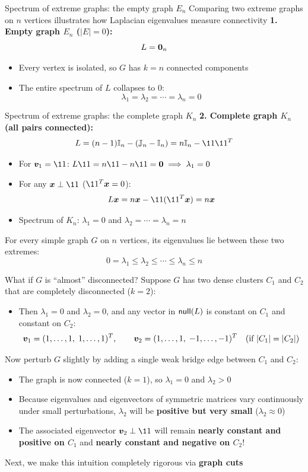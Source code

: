 \documentclass[aspectratio=169]{beamer}\usepackage[]{graphicx}\usepackage[]{xcolor}
\begin{document}


\begin{frame}{Spectrum of extreme graphs: the empty graph $E_n$}
Comparing two extreme graphs on $n$ vertices illustrates how Laplacian eigenvalues measure connectivity
\vfill
\textbf{1. Empty graph $E_n$ ($|E| = 0$):}
\[
L = \b0_n
\]
\vfill
\begin{itemize}
\item Every vertex is isolated, so $G$ has $k = n$ connected components
\vfill
\item The entire spectrum of $L$ collapses to $0$:
\[
\lambda_1 = \lambda_2 = \cdots = \lambda_n = 0
\]
\end{itemize}
\end{frame}


\begin{frame}{Spectrum of extreme graphs: the complete graph $K_n$}
\textbf{2. Complete graph $K_n$ (all pairs connected):}
\[
L = (n - 1)\II_n - (\IJ_n - \II_n) = n\II_n - \11\11^T
\]
\begin{itemize}
\item For $\bv_1 = \11$: $L\11 = n\11 - n\11 = \b0 \implies \lambda_1 = 0$
\item For any $\bx \perp \11$ ($\11^T \bx = 0$):
\[
L\bx = n\bx - \11(\11^T \bx) = n\bx
\]
\item Spectrum of $K_n$: $\lambda_1 = 0$ and $\lambda_2 = \cdots = \lambda_n = n$
\end{itemize}
\vfill
For every simple graph $G$ on $n$ vertices, its eigenvalues lie between these two extremes:
\[
0 = \lambda_1 \le \lambda_2 \le \cdots \le \lambda_n \le n
\]
\end{frame}


\begin{frame}{What if $G$ is ``almost'' disconnected?}
Suppose $G$ has two dense clusters $C_1$ and $C_2$ that are completely disconnected ($k = 2$):
\begin{itemize}
\item Then $\lambda_1 = 0$ and $\lambda_2 = 0$, and any vector in $\mathsf{null}(L)$ is constant on $C_1$ and constant on $C_2$:
\[
\bm{v}_1 = (1, \ldots, 1, \; 1, \ldots, 1)^T, \qquad \bm{v}_2 = (1, \ldots, 1, \; -1, \ldots, -1)^T \quad (\text{if } |C_1| = |C_2|)
\]
\end{itemize}
\vfill
Now perturb $G$ slightly by adding a single weak bridge edge between $C_1$ and $C_2$:
\begin{itemize}
\item The graph is now connected ($k = 1$), so $\lambda_1 = 0$ and $\lambda_2 > 0$
\item Because eigenvalues and eigenvectors of symmetric matrices vary continuously under small perturbations, $\lambda_2$ will be \textbf{positive but very small} ($\lambda_2 \approx 0$)
\item The associated eigenvector $\bv_2 \perp \11$ will remain \textbf{nearly constant and positive on $C_1$} and \textbf{nearly constant and negative on $C_2$}!
\end{itemize}
\vfill
Next, we make this intuition completely rigorous via \textbf{graph cuts}
\end{frame}
\end{document}
